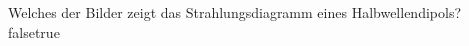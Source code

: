     {Welches der Bilder zeigt das Strahlungsdiagramm eines Halbwellendipols?}
    {}
    {}
    {}
    {}
    {false}{true}